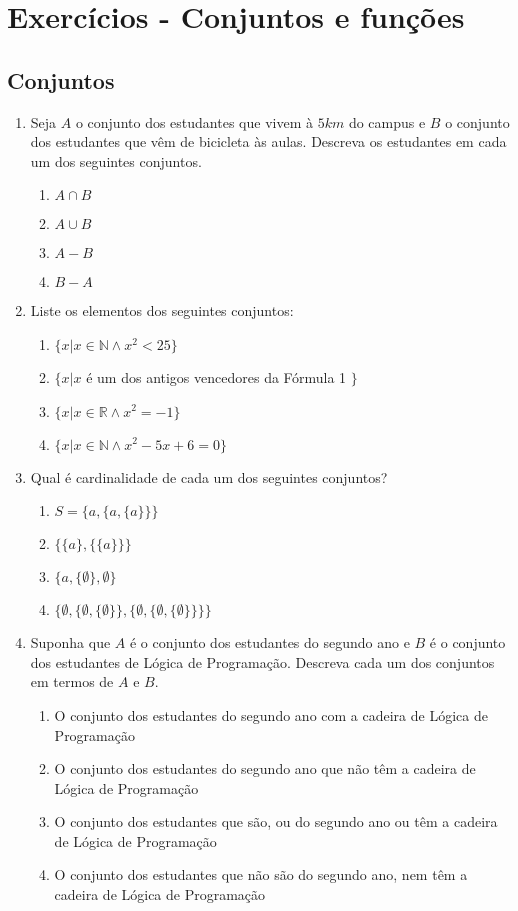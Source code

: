 \chapter*{Exercícios - Conjuntos e funções}

\section*{Conjuntos}

\begin{enumerate}
  	\item Seja $A$ o conjunto dos estudantes que vivem à $5 km$ do campus e $B$ o conjunto dos estudantes que vêm 
  	de bicicleta às aulas. Descreva os estudantes em cada um dos seguintes conjuntos.
  	\begin{enumerate}
  	  	\item $A \cap B$ \item $A \cup B$ \item $A - B$ \item $B - A$
  	\end{enumerate}
  	
  	\item Liste os elementos dos seguintes conjuntos:
  	\begin{enumerate}
  		 \item $\{x | x \in \mathbb{N} \land x^2 < 25\}$ \item $\{x | x$ é um dos antigos vencedores da Fórmula 1 $\}$
  		 \item $\{x | x \in \mathbb{R} \land x^2 = -1\}$ \item $\{x | x \in \mathbb{N} \land x^2 - 5x + 6 = 0\}$
	\end{enumerate}
	
	\item Qual é cardinalidade de cada um dos seguintes conjuntos?
	\begin{enumerate}
	  	\item $ S = \{a, \{a, \{a\}\}\}$ \item $\{\{a\}, \{\{a\}\}\}$ \item $\{a, \{\emptyset \}, \emptyset\}$
	  	\item $\{\emptyset, \{\emptyset, \{\emptyset\}\},\{\emptyset, \{\emptyset, \{\emptyset\}\}\}\}$
	\end{enumerate}
	
  	\item Suponha que $A$ é o conjunto dos estudantes do segundo ano e $B$ é o conjunto dos estudantes de Lógica de Programação.
  	Descreva cada um dos conjuntos em termos de $A$ e $B$.
  	\begin{enumerate}
  		\item O conjunto dos estudantes do segundo ano com a cadeira de Lógica de Programação
  		\item O conjunto dos estudantes do segundo ano que não têm a cadeira de Lógica de Programação
  		\item O conjunto dos estudantes que são, ou do segundo ano ou têm a cadeira de Lógica de Programação
  		\item O conjunto dos estudantes que não são do segundo ano, nem têm a cadeira de Lógica de Programação
	\end{enumerate}


\end{enumerate}
